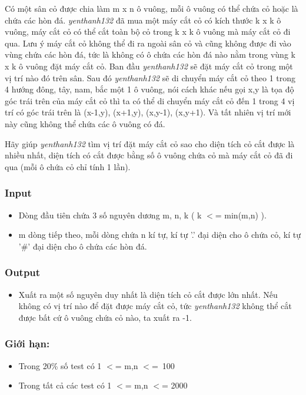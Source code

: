 



   Có một sân cỏ được chia làm m x n ô vuông, mỗi ô vuông có thể chứa cỏ hoặc là chứa các hòn đá.   \emph{    yenthanh132   }   đã mua một máy cắt cỏ có kích thước k x k ô vuông, máy cắt cỏ có thể cắt toàn bộ cỏ trong k x k ô vuông mà máy cắt cỏ đi qua. Lưu ý máy cắt cỏ không thể đi ra ngoài sân cỏ và cũng không được đi vào vùng chứa các hòn đá, tức là không có ô chứa các hòn đá nào nằm trong vùng k x k ô vuông đặt máy cắt cỏ. Ban đầu   \emph{    yenthanh132   }   sẽ đặt máy cắt cỏ trong một vị trí nào đó trên sân. Sau đó   \emph{    yenthanh132   }   sẽ di chuyển máy cắt cỏ theo 1 trong 4 hướng đông, tây, nam, bắc một 1 ô vuông, nói cách khác nếu gọi x,y là tọa độ góc trái trên của máy cắt cỏ thì ta có thể di chuyển máy cắt cỏ đến 1 trong 4 vị trí có góc trái trên là (x-1,y), (x+1,y), (x,y-1), (x,y+1). Và tất nhiên vị trí mới này cũng không thể chứa các ô vuông có đá.  

   Hãy giúp   \emph{    yenthanh132   }   tìm vị trí đặt máy cắt cỏ sao cho diện tích cỏ cắt được là nhiều nhất, diện tích có cắt được bằng số ô vuông chứa cỏ mà máy cắt cỏ đã đi qua (mỗi ô chứa cỏ chỉ tính 1 lần).  

\subsubsection{   Input  }
\begin{itemize}
	\item     Dòng đầu tiên chứa 3 số nguyên dương m, n, k ( k $<$= min(m,n) ).   
	\item     m dòng tiếp theo, mỗi dòng chứa n kí tự, kí tự '.' đại diện cho ô chứa cỏ, kí tự '\#' đại diện cho ô chứa các hòn đá.   
\end{itemize}

\subsubsection{   Output  }
\begin{itemize}
	\item     Xuất ra một số nguyên duy nhất là diện tích cỏ cắt được lớn nhất. Nếu không có vị trí nào để đặt được máy cắt cỏ, tức    \emph{     yenthanh132    }    không thể cắt được bất cứ ô vuông chứa cỏ nào, ta xuất ra -1.   
\end{itemize}

\subsubsection{   Giới hạn:  }
\begin{itemize}
	\item     Trong 20\% số test có 1 $<$= m,n $<$= 100   
	\item     Trong tất cả các test có 1 $<$= m,n $<$= 2000   
\end{itemize}

